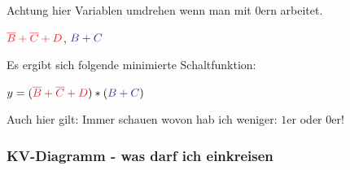 \documentclass{article}
\begin{document}
Achtung hier Variablen umdrehen wenn man mit $0$ern arbeitet.

$\textcolor{Red}{\overline{B}+\overline{C}+D}$, $\textcolor{Blue}{B+C}$


Es ergibt sich folgende minimierte Schaltfunktion:

$y=(\textcolor{Red}{\overline{B}+\overline{C}+D}) * (\textcolor{Blue}{B+C}) $



\begin{info}
    Auch hier gilt: Immer schauen wovon hab ich weniger: $1$er oder $0$er!
\end{info}


\subsubsection{KV-Diagramm - was darf ich einkreisen}
\end{document}
